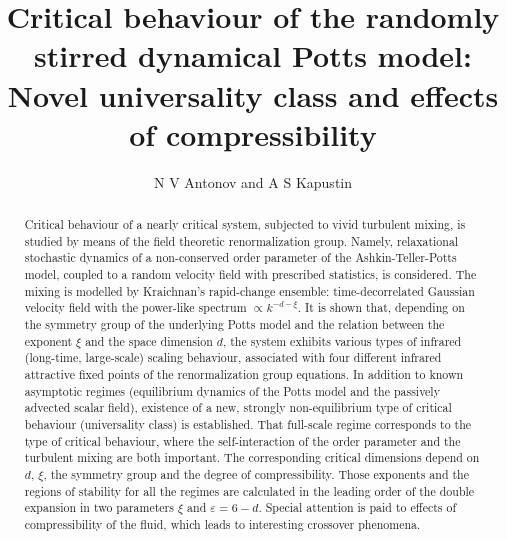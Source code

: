 \documentclass[12pt]{iopart}
\begin{document}
\title[Critical behaviour of the stirred dynamical Potts model]
{Critical behaviour of the randomly stirred dynamical Potts model:
Novel universality class and effects of compressibility}

\author{ N V Antonov and A S Kapustin}

\address{Department of Theoretical Physics, St.~Petersburg State University
\\ Uljanovskaja 1, St.~Petersburg, Petrodvorez, 198504 Russia}


\begin{abstract}
Critical behaviour of a nearly critical system, subjected to vivid turbulent
mixing, is studied by means of the field theoretic renormalization group.
Namely, relaxational stochastic dynamics of a non-conserved order parameter
of the Ashkin-Teller-Potts model, coupled to a random velocity field with
prescribed statistics, is considered. The mixing is modelled by Kraichnan's
rapid-change ensemble: time-decorrelated Gaussian velocity field with the
power-like spectrum $\propto k^{-d-\xi}$. It is shown that, depending on the
symmetry group of the underlying Potts model and the relation between the
exponent $\xi$ and the space dimension $d$, the system exhibits various types
of infrared (long-time, large-scale) scaling behaviour, associated with four
different infrared attractive fixed points of the renormalization group
equations. In addition to known asymptotic regimes (equilibrium dynamics of
the Potts model and the passively advected scalar field), existence of a
new, strongly non-equilibrium type of critical behaviour (universality class)
is established. That full-scale regime corresponds to the type of critical
behaviour, where the self-interaction of the order parameter and the turbulent
mixing are both important. The corresponding critical dimensions depend on
$d$, $\xi$, the symmetry group and the degree of compressibility. Those
exponents and the regions of stability for all the regimes are calculated
in the leading order of the double expansion in two parameters $\xi$ and
$\varepsilon=6-d$. Special attention is paid to effects of compressibility
of the fluid, which leads to interesting crossover phenomena.
\end{abstract}


\maketitle
\end{document}
